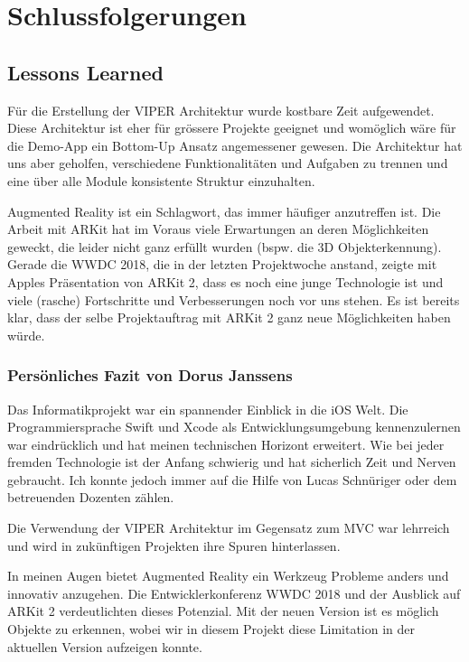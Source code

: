 \section{Schlussfolgerungen}

\subsection{Lessons Learned}

Für die Erstellung der VIPER Architektur wurde kostbare Zeit aufgewendet.
Diese Architektur ist eher für grössere Projekte geeignet und womöglich wäre für die Demo-App ein Bottom-Up Ansatz angemessener gewesen.
Die Architektur hat uns aber geholfen, verschiedene Funktionalitäten und Aufgaben zu trennen und eine über alle Module konsistente Struktur einzuhalten.

Augmented Reality ist ein Schlagwort, das immer häufiger anzutreffen ist.
Die Arbeit mit ARKit hat im Voraus viele Erwartungen an deren Möglichkeiten geweckt, die leider nicht ganz erfüllt wurden (bspw. die 3D Objekterkennung).
Gerade die WWDC 2018, die in der letzten Projektwoche anstand, zeigte mit Apples Präsentation von ARKit 2, dass es noch eine junge Technologie ist und viele (rasche) Fortschritte und Verbesserungen noch vor uns stehen.
Es ist bereits klar, dass der selbe Projektauftrag mit ARKit 2 ganz neue Möglichkeiten haben würde.

\subsubsection{Persönliches Fazit von Dorus Janssens}
Das Informatikprojekt war ein spannender Einblick in die iOS Welt. Die Programmiersprache Swift und Xcode als Entwicklungsumgebung kennenzulernen war eindrücklich und hat meinen technischen Horizont erweitert. Wie bei jeder fremden Technologie ist der Anfang schwierig und hat sicherlich Zeit und Nerven gebraucht. Ich konnte jedoch immer auf die Hilfe von Lucas Schnüriger oder dem betreuenden Dozenten zählen.

Die Verwendung der VIPER Architektur im Gegensatz zum MVC war lehrreich und wird in zukünftigen Projekten ihre Spuren hinterlassen.

In meinen Augen bietet Augmented Reality ein Werkzeug Probleme anders und innovativ anzugehen. Die Entwicklerkonferenz WWDC 2018 und der Ausblick auf ARKit 2 verdeutlichten dieses Potenzial. Mit der neuen Version ist es möglich Objekte zu erkennen, wobei wir in diesem Projekt diese Limitation in der aktuellen Version aufzeigen konnte. 

